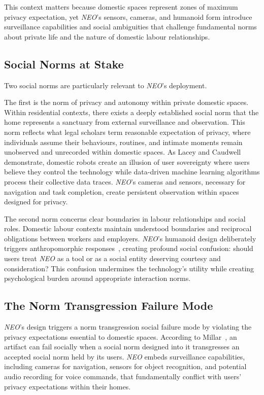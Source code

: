 \documentclass[11pt,showkeys]{../../shared/essay}
\newcommand{\neo}{\textit{NEO}}
\begin{document}
This context matters because domestic spaces represent zones of maximum privacy expectation, yet \neo{}'s sensors, cameras, and humanoid form introduce surveillance capabilities and social ambiguities that challenge fundamental norms about private life and the nature of domestic labour relationships.

\subsection{Social Norms at Stake}

Two social norms are particularly relevant to \neo{}'s deployment.

The first is the norm of privacy and autonomy within private domestic spaces. Within residential contexts, there exists a deeply established social norm that the home represents a sanctuary from external surveillance and observation. This norm reflects what legal scholars term reasonable expectation of privacy, where individuals assume their behaviours, routines, and intimate moments remain unobserved and unrecorded within domestic spaces. As Lacey and Caudwell~\cite{lacey_cuteness_2019} demonstrate, domestic robots create an illusion of user sovereignty where users believe they control the technology while data-driven machine learning algorithms process their collective data traces. \neo{}'s cameras and sensors, necessary for navigation and task completion, create persistent observation within spaces designed for privacy.

The second norm concerns clear boundaries in labour relationships and social roles. Domestic labour contexts maintain understood boundaries and reciprocal obligations between workers and employers. \neo{}'s humanoid design deliberately triggers anthropomorphic responses~\cite{darling_whos_2015}, creating profound social confusion: should users treat \neo{} as a tool or as a social entity deserving courtesy and consideration? This confusion undermines the technology's utility while creating psychological burden around appropriate interaction norms.

\subsection{The Norm Transgression Failure Mode}

\neo{}'s design triggers a norm transgression social failure mode by violating the privacy expectations essential to domestic spaces. According to Millar~\cite{millar_social_2020}, an artifact can fail socially when a social norm designed into it transgresses an accepted social norm held by its users. \neo{} embeds surveillance capabilities, including cameras for navigation, sensors for object recognition, and potential audio recording for voice commands, that fundamentally conflict with users' privacy expectations within their homes.
\end{document}
